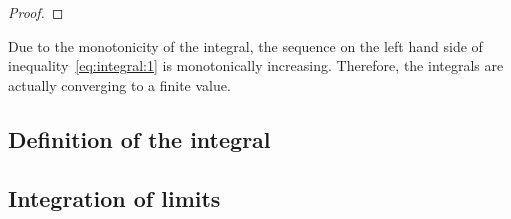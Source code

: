 \begin{todo}
  \begin{proof}
    
  \end{proof}
\end{todo}

\begin{remark}
  \label{remark:integral:1}
  Due to the monotonicity of the integral, the sequence on the left
  hand side of inequality~\eqref{eq:integral:1} is monotonically
  increasing. Therefore, the integrals are actually converging to a
  finite value.
\end{remark}

\subsection{Definition of the integral}




\subsection{Integration of limits}

